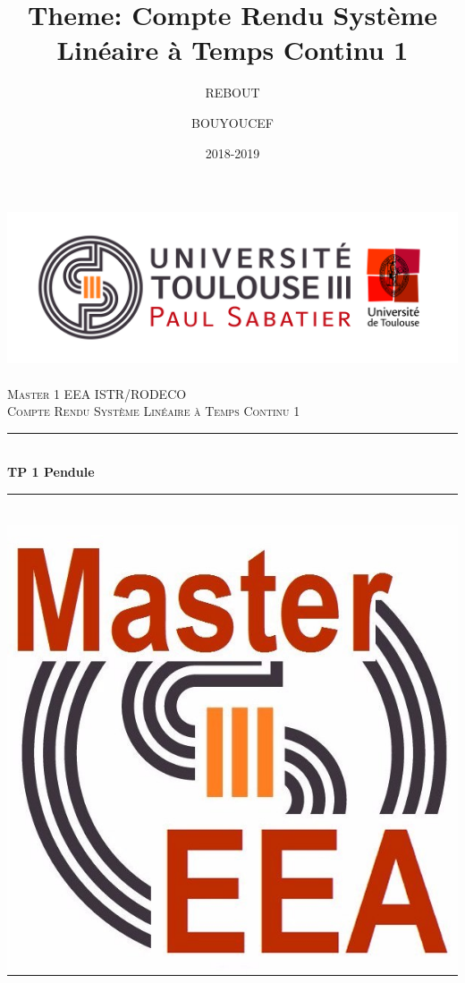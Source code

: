 \documentclass[12pt, a4paper, openany]{report}
\title{Theme: Compte Rendu Système Linéaire à Temps Continu 1}
\author{REBOUT \bsc{Mehenna}}
\author{BOUYOUCEF \bsc{Farid}}
\date{2018-2019}
\newcommand{\HRule}{\rule{\linewidth}{0.5mm}}
\begin{document}

\makeatletter
  \begin{titlepage}
  

  \begin{sffamily}
   \begin{center}

    \includegraphics[scale=0.5]{Logo_UT3.jpg}~\\[1.5cm]

    \textsc{\LARGE Master 1 EEA ISTR/RODECO  }\\[2cm]

    \textsc{\Large Compte Rendu  Système Linéaire à Temps Continu 1}\\[1.5cm]

    \HRule \\[0.4cm] %
    { \huge \bfseries TP 1 Pendule\\[0.4cm] }

    \HRule \\[1cm]   %
    \includegraphics[scale=0.1]{logomaster.jpg}
    \\[1cm]


\end{center}
\end{sffamily}
\end{titlepage}
\end{document}
